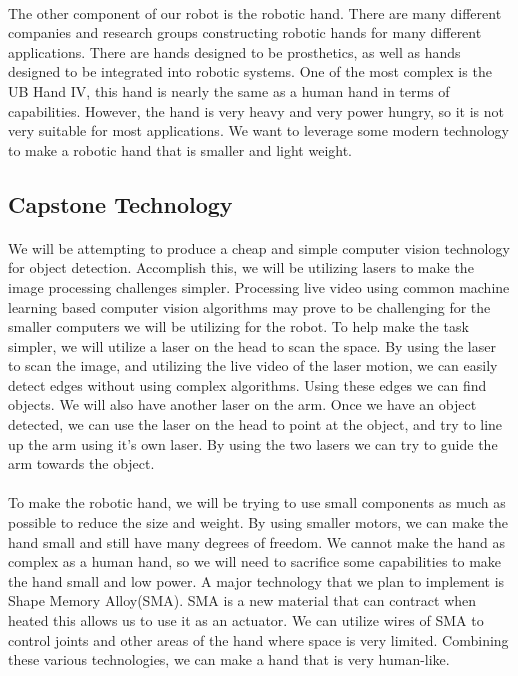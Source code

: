 \documentclass{article}
\begin{document}
\paragraph{} The other component of our robot is the robotic hand. There are
many different companies and research groups constructing robotic hands for
many different applications. There are hands designed to be prosthetics, as
well as hands designed to be integrated into robotic systems. One of the most
complex is the UB Hand IV, this hand is nearly the same as a human hand in
terms of capabilities. However, the hand is very heavy and very power hungry,
so it is not very suitable for most applications\cite{Melchiorri2013}. We want
to leverage some modern technology to make a robotic hand that is smaller and
light weight.

\subsection{Capstone Technology} \paragraph{} We will be attempting to produce
a cheap and simple computer vision technology for object detection. Accomplish
this, we will be utilizing lasers to make the image processing challenges
simpler. Processing live video using common machine learning based computer
vision algorithms may prove to be challenging for the smaller computers we will
be utilizing for the robot. To help make the task simpler, we will utilize a
laser on the head to scan the space. By using the laser to scan the image, and
utilizing the live video of the laser motion, we can easily detect edges
without using complex algorithms. Using these edges we can find objects. We
will also have another laser on the arm. Once we have an object detected, we
can use the laser on the head to point at the object, and try to line up the
arm using it's own laser. By using the two lasers we can try to guide the arm
towards the object.

\paragraph{} To make the robotic hand, we will be trying to use small
components as much as possible to reduce the size and weight. By using smaller
motors, we can make the hand small and still have many degrees of freedom. We
cannot make the hand as complex as a human hand, so we will need to sacrifice
some capabilities to make the hand small and low power. A major technology that
we plan to implement is Shape Memory Alloy(SMA). SMA is a new material that can
contract when heated this allows us to use it as an actuator. We can utilize
wires of SMA to control joints and other areas of the hand where space is very
limited. Combining these various technologies, we can make a hand that is very
human-like.



\end{document}

